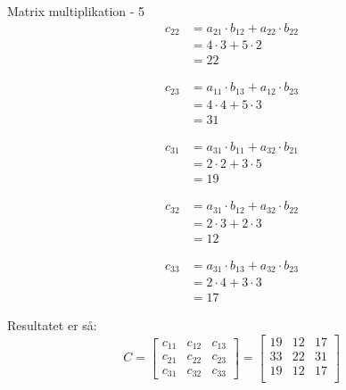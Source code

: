 \documentclass{article}
\begin{document}
\begin{exercise}{Matrix multiplikation - 5}
	\hint
	\begin{align*}
		c_{22} & = a_{21} \cdot b_{12} + a_{22} \cdot b_{22} \\
		& = 4 \cdot 3 + 5 \cdot 2 \\
		& = 22
	\end{align*}
	
	\hint
	\begin{align*}
		c_{23} & = a_{11} \cdot b_{13} + a_{12} \cdot b_{23} \\
	& = 4 \cdot 4 + 5 \cdot 3 \\
	& = 31
	\end{align*}

	\hint
	\begin{align*}
		c_{31} & = a_{31} \cdot b_{11} + a_{32} \cdot b_{21} \\
	& = 2 \cdot 2 + 3 \cdot 5 \\
	& = 19
	\end{align*}	
	
	\hint
	\begin{align*}
		c_{32} & = a_{31} \cdot b_{12} + a_{32} \cdot b_{22} \\
	& = 2 \cdot 3 + 2 \cdot 3 \\
	& = 12
	\end{align*}

	\hint
	\begin{align*}
		c_{33} & = a_{31} \cdot b_{13} + a_{32} \cdot b_{23} \\
	& = 2 \cdot 4 + 3 \cdot 3 \\
	& = 17
	\end{align*}	
	
	
	
	\hint
	Resultatet er så:
	\[
	C = \left[\begin{array}{rrr}
	c_{11} & c_{12} & c_{13} \\
	c_{21} & c_{22} & c_{23} \\
	c_{31} & c_{32} & c_{33}
	\end{array} \right] = 
	\left[\begin{array}{rrr}
	19 & 12 & 17 \\
	33 & 22 & 31 \\
	19 & 12 & 17 \\
	\end{array} \right]
	\]
	
	
\end{exercise}

\newpage
\end{document}
